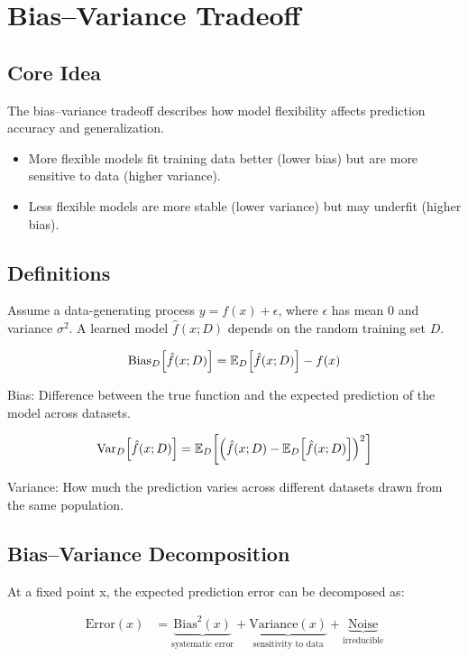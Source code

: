\documentclass[10pt,a4paper]{article}
\begin{document}
	\section{Bias--Variance Tradeoff}

	\subsection{Core Idea}
	The bias--variance tradeoff describes how model flexibility affects prediction accuracy and generalization.

	\begin{itemize}
		\item More flexible models fit training data better (lower bias) but are more sensitive to data (higher variance).
		\item Less flexible models are more stable (lower variance) but may underfit (higher bias).
	\end{itemize}

	\subsection{Definitions}
	Assume a data-generating process $y=f(x)+\epsilon$, where $\epsilon$ has mean 0 and variance $\sigma^2$. A learned model $\hat{f}(x;D)$ depends on the random training set $D$.

	\begin{align*}
			\Large \mathrm{Bias}_D\!\left[\hat f(x;D)\right]= \mathbb{E}_D\!\left[\hat f(x;D)\right] - f(x)
	\end{align*}


	Bias: Difference between the true function and the expected prediction of the model across datasets.

	\begin{align*}
			\Large \mathrm{Var}_D\!\left[\hat f(x;D)\right]= \mathbb{E}_D\!\left[\left(\hat f(x;D) - \mathbb{E}_D\!\left[\hat f(x;D)\right]\right)^2\right]
	\end{align*}


	Variance: How much the prediction varies across different datasets drawn from the same population.


	\subsection{Bias--Variance Decomposition}
	At a fixed point x, the expected prediction error can be decomposed as:

	\begin{align*}
			\mathrm{Error}(x)
			&= \underbrace{\mathrm{Bias}^2(x)}_{\text{systematic error}}
			+ \underbrace{\mathrm{Variance}(x)}_{\text{sensitivity to data}}
			+ \underbrace{\mathrm{Noise}}_{\text{irreducible}}
	\end{align*}
\end{document}

